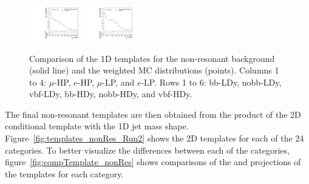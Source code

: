 \begin{figure}[htbp]
  \includegraphics[width=0.2\textwidth]{fig/2Dfit/templateVsReco_nonRes_r0_MJ_mu_LP_vbf_HDy.pdf}
  \includegraphics[width=0.2\textwidth]{fig/2Dfit/templateVsReco_nonRes_r0_MJ_e_LP_vbf_HDy.pdf}\\
  \caption{
    Comparison of the 1D \MJ templates for the non-resonant background (solid line) and the weighted MC distributions (points).
    Columns 1 to 4: $\mu$-HP, $e$-HP, $\mu$-LP, and $e$-LP.
    Rows 1 to 6: bb-LDy, nobb-LDy, vbf-LDy, bb-HDy, nobb-HDy, and vbf-HDy.
  }
  \label{fig:1dtemplateVsReco_nonRes_MJ_Run2}
\end{figure}

The final non-resonant templates are then obtained from the product of the 2D conditional template with the 1D jet mass shape.
Figure~\ref{fig:templates_nonRes_Run2} shows the 2D templates for each of the 24 categories.
To better visualize the differences between each of the categories, figure~\ref{fig:compTemplate_nonRes} shows comparisons of the \MVV and \MJ projections of the templates for each category.

